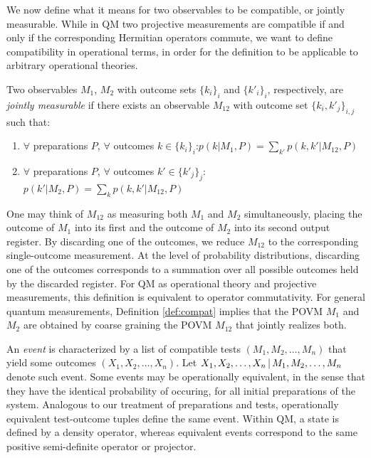 We now define what it means for two observables to be compatible, or jointly measurable. While in QM two projective measurements are compatible if and only if the corresponding Hermitian operators commute, we want to define compatibility in operational terms, in order for the definition to be applicable to arbitrary operational theories.

\begin{definition}
\label{def:compat}
Two observables $M_{1}$, $M_{2}$ with outcome sets $\{k_i\}_i$ and $\{k'_i\}_{i}$, respectively, are \emph{jointly measurable} if there exists an observable $M_{12}$ with outcome set $\{k_i,k'_j\}_{i,j}$ such that:
\begin{enumerate}
\item $\forall$ preparations $P$, $\forall$ outcomes $k\in\{k_i\}_i$:\hfill\break $p(k\vert M_1,P)=\sum_{k'}p(k,k'\vert M_{12},P)$
\item $\forall$ preparations $P$, $\forall$ outcomes $k'\in\{k'_j\}_j$:\hfill\break $p(k'\vert M_2,P)=\sum_{k}p(k,k'\vert M_{12},P)$
\end{enumerate}
\end{definition}

\noindent One may think of $M_{12}$ as measuring both $M_{1}$ and $M_{2}$ simultaneously, placing the outcome of $M_{1}$ into its first and the outcome of $M_{2}$ into its second output register. By discarding one of the outcomes, we reduce $M_{12}$ to the corresponding single-outcome measurement. At the level of probability distributions, discarding one of the outcomes corresponds to a summation over all possible outcomes held by the discarded register. For QM as operational theory and projective measurements, this definition is equivalent to operator commutativity. For general quantum measurements, Definition \ref{def:compat} implies that the POVM $M_1$ and $M_2$ are obtained by coarse graining the POVM $M_{12}$ that jointly realizes both.

An \emph{event} is characterized by a list of compatible tests $(M_1, M_2, \dots, M_n)$ that yield some outcomes $(X_1, X_2, \dots, X_n)$. Let $X_1,X_2,\dots, X_n\thinspace\vert\thinspace M_1,M_2,\dots, M_n$ denote such event. Some events may be operationally equivalent, in the sense that they have the identical probability of occuring, for all initial preparations of the system. Analogous to our treatment of preparations and tests, operationally equivalent test-outcome tuples define the same event. Within QM, a state is defined by a density operator, whereas equivalent events correspond to the same positive semi-definite operator or projector.

